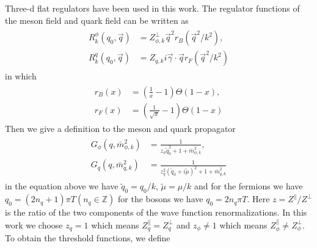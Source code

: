 \documentclass[%
reprint,
superscriptaddress,
showpacs,preprintnumbers,
 amsmath,amssymb,
 aps,
prd,
]{revtex4-1}
\begin{document}


Three-d flat regulators have been used in this work. The regulator functions of the meson field and quark field can be 
written as
\begin{align}
\begin{split}
R^{\phi}_{k}(q_0,\vec{q})&=Z^{\bot}_{\phi,k}\vec{q}^2r_B(\vec{q}^2/k^2) ,\\
R^{q}_{k}(q_0,\vec{q})&=Z_{q,k}i\vec{\gamma}\cdot\vec{q}r_F(\vec{q}^2/k^2)
\end{split}
\end{align} 
in which
\begin{align}
\begin{split}
r_B(x)&=\left( \frac{1}{x}-1 \right)\Theta(1-x) ,\\
r_F(x)&=\left( \frac{1}{\sqrt{x}}-1 \right)\Theta(1-x)
\end{split}
\end{align} 
Then we give a definition to the meson and quark propagator
\begin{align}
\begin{split}
G_\phi(q,\bar{m}^{2}_{\phi,k})&=\frac{1}{z_\phi\tilde{q}^{2}_{0}+1+\bar{m}^{2}_{\phi,k}} ,\\
G_q(q,\bar{m}^{2}_{q,k})&=\frac{1}{z^{2}_{q}(\tilde{q}_0+i\tilde{\mu})^2+1+\bar{m}^{2}_{q,k}}
\end{split}
\end{align} 
in the equation above we have $\tilde{q}_0=q_0/k$, $\tilde{\mu}=\mu/k$ and for the fermions we have
$q_0=(2n_q+1)\pi T (n_q\in \mathbb{Z})$ for the bosons we have $q_0=2n_q\pi T$. Here $z=Z^\|/Z^\bot$ is the ratio of the 
two components of the wave function renormalizations. In this work we choose $z_q=1$ which means $Z^{\|}_{q}=
Z^{\bot}_{q}$ and $z_\phi\neq 1$ which means $Z^{\|}_{\phi}\neq Z^{\bot}_{\phi}$. To obtain the threshold functions, we 
define
\end{document}
